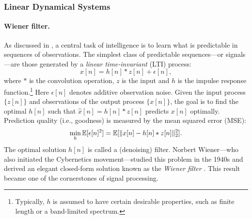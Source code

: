 \documentclass[../../book-main.tex]{subfiles}
\begin{document}
\subsubsection{Linear Dynamical Systems}
\label{sec:linear-systems}

\paragraph{Wiener filter.}

As discussed in , a central task of intelligence is to learn what is predictable in sequences of observations. The simplest class of predictable sequences---or signals---are those generated by a \textit{linear time-invariant} (LTI) process:
\begin{equation}
    x[n] = h[n]*z[n] + \epsilon[n], 
    \label{eqn:Wiener-model}
\end{equation}
where \(*\) is the convolution operation, \(z\) is the input and \(h\) is the impulse response function.\footnote{Typically, \(h\) is assumed to have certain desirable properties, such as finite length or a band-limited spectrum.} Here \(\epsilon[n]\) denotes additive observation noise. Given the input process \(\{z[n]\}\) and observations of the output process \(\{x[n]\}\), the goal is to find the optimal \(h[n]\) such that \(\hat{x}[n] = h[n]*z[n]\) predicts \(x[n]\) optimally. Prediction quality (i.e., goodness) is measured by the mean squared error (MSE):
\begin{equation}
    \min_{h} \operatorname{\mathbb{E}}[\epsilon[n]^{2}] = \operatorname{\mathbb{E}}[\|x[n] - h[n]*z[n]\|_{2}^{2}].
    \label{eqn:wiener-mse}
\end{equation}
The optimal solution \(h[n]\) is called a (denoising) filter. Norbert Wiener---who also initiated the Cybernetics movement---studied this problem in the 1940s and derived an elegant closed-form solution known as the \textit{Wiener filter} \cite{Wiener-1942,Wiener-1949}. This result became one of the cornerstones of signal processing.
\end{document}

